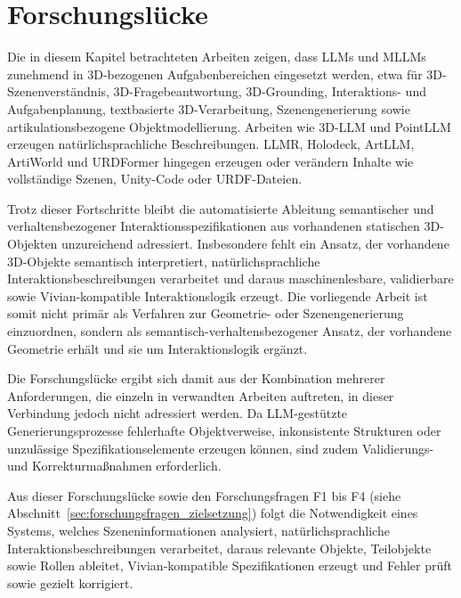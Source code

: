 \section{Forschungslücke}\label{sec:forschungslücke}

Die in diesem Kapitel betrachteten Arbeiten zeigen, dass LLMs und MLLMs zunehmend in 3D-bezogenen Aufgabenbereichen eingesetzt werden, etwa für 3D-Szenenverständnis, 3D-Fragebeantwortung, 3D-Grounding, Interaktions- und Aufgabenplanung, textbasierte 3D-Verarbeitung, Szenengenerierung sowie artikulationsbezogene Objektmodellierung.
Arbeiten wie 3D-LLM und PointLLM erzeugen natürlichsprachliche Beschreibungen. LLMR, Holodeck, ArtLLM, ArtiWorld und URDFormer hingegen erzeugen oder verändern Inhalte wie vollständige Szenen, Unity-Code oder URDF-Dateien.

Trotz dieser Fortschritte bleibt die automatisierte Ableitung semantischer und verhaltensbezogener Interaktionsspezifikationen aus vorhandenen statischen 3D-Objekten unzureichend adressiert. Insbesondere fehlt ein Ansatz, der vorhandene 3D-Objekte semantisch interpretiert, natürlichsprachliche Interaktionsbeschreibungen verarbeitet und daraus maschinenlesbare, validierbare sowie Vivian-kompatible Interaktionslogik erzeugt.
Die vorliegende Arbeit ist somit nicht primär als Verfahren zur Geometrie- oder Szenengenerierung einzuordnen, sondern als semantisch-verhaltensbezogener Ansatz, der vorhandene Geometrie erhält und sie um Interaktionslogik ergänzt.

Die Forschungslücke ergibt sich damit aus der Kombination mehrerer Anforderungen, die einzeln in verwandten Arbeiten auftreten, in dieser Verbindung jedoch nicht adressiert werden. Da LLM-gestützte Generierungsprozesse fehlerhafte Objektverweise, inkonsistente Strukturen oder unzulässige Spezifikationselemente erzeugen können, sind zudem Validierungs- und Korrekturmaßnahmen erforderlich.

Aus dieser Forschungslücke sowie den Forschungsfragen F1 bis F4 (siehe Abschnitt~\ref{sec:forschungsfragen_zielsetzung}) folgt die Notwendigkeit eines Systems, welches Szeneninformationen analysiert, natürlichsprachliche Interaktionsbeschreibungen verarbeitet, daraus relevante Objekte, Teilobjekte sowie Rollen ableitet, Vivian-kompatible Spezifikationen erzeugt und Fehler prüft sowie gezielt korrigiert.

